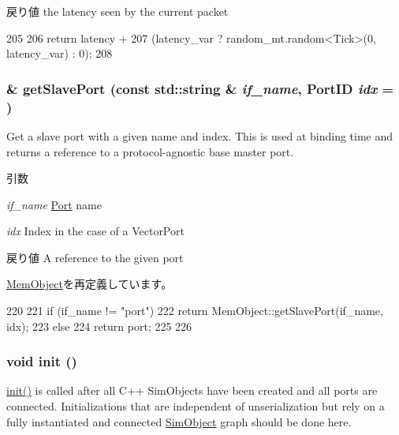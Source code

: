 \begin{DoxyReturn}{戻り値}
the latency seen by the current packet 
\end{DoxyReturn}



\begin{DoxyCode}
205 {
206     return latency +
207         (latency_var ? random_mt.random<Tick>(0, latency_var) : 0);
208 }
\end{DoxyCode}
\hypertarget{classSimpleMemory_ac918a145092d7514ebc6dbd952dceafb}{
\subsubsection[{getSlavePort}]{ \& getSlavePort (const std::string \& {\em if\_\-name}, \/  {\bf PortID} {\em idx} = {})}}
\label{classSimpleMemory_ac918a145092d7514ebc6dbd952dceafb}
Get a slave port with a given name and index. This is used at binding time and returns a reference to a protocol-\/agnostic base master port.


\begin{DoxyParams}{引数}
\item[{\em if\_\-name}]\hyperlink{classPort}{Port} name \item[{\em idx}]Index in the case of a VectorPort\end{DoxyParams}
\begin{DoxyReturn}{戻り値}
A reference to the given port 
\end{DoxyReturn}


\hyperlink{classMemObject_ac918a145092d7514ebc6dbd952dceafb}{MemObject}を再定義しています。


\begin{DoxyCode}
220 {
221     if (if_name != "port") {
222         return MemObject::getSlavePort(if_name, idx);
223     } else {
224         return port;
225     }
226 }
\end{DoxyCode}
\hypertarget{classSimpleMemory_a02fd73d861ef2e4aabb38c0c9ff82947}{
\subsubsection[{init}]{\setlength{\rightskip}{0pt plus 5cm}void init ()}}
\label{classSimpleMemory_a02fd73d861ef2e4aabb38c0c9ff82947}
\hyperlink{classSimpleMemory_a02fd73d861ef2e4aabb38c0c9ff82947}{init()} is called after all C++ SimObjects have been created and all ports are connected. Initializations that are independent of unserialization but rely on a fully instantiated and connected \hyperlink{classSimObject}{SimObject} graph should be done here. 

